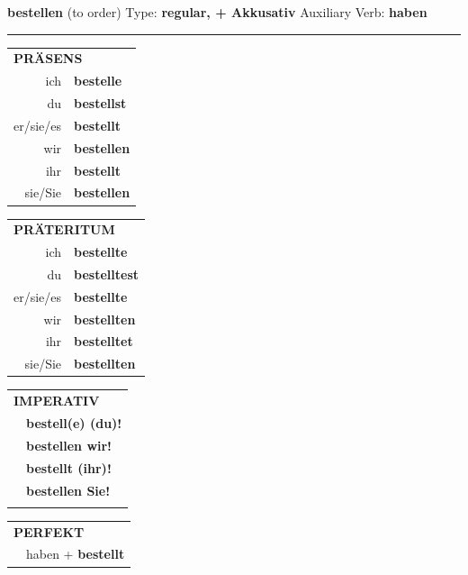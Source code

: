 \documentclass[10pt,a4paper]{revtex4-2}
\begin{document}
\begin{verbbox-acc}
    {\Large \bf bestellen} (to order) \hfill Type: \textbf{regular, + Akkusativ} \hfill Auxiliary Verb: \textbf{haben} 
    
     \vspace{5pt}

    \hrule
    
    \vspace{5pt}

  \begin{tabular}{rl}
     \multicolumn{2}{l}{\textbf{PRÄSENS} }\\
    ich & \textbf{bestelle}\\
    du & \textbf{bestellst}\\
    er/sie/es & \textbf{bestellt}\\
    wir & \textbf{bestellen}\\
    ihr & \textbf{bestellt}\\
    sie/Sie & \textbf{bestellen}\\
  \end{tabular}
  \hfill
     \begin{tabular}{rl}
    \multicolumn{2}{l}{\textbf{PRÄTERITUM} }\\
    ich & \textbf{bestellte}\\
    du & \textbf{bestelltest}\\
    er/sie/es & \textbf{bestellte}\\
    wir & \textbf{bestellten}\\
    ihr & \textbf{bestelltet}\\
    sie/Sie & \textbf{bestellten}\\
  \end{tabular}
  \hfill
  \begin{tabular}{rl}
     \multicolumn{2}{l}{\textbf{IMPERATIV} }\\
   & \textbf{bestell(e) (du)!}\\
   & \textbf{bestellen wir!}\\
   & \textbf{bestellt (ihr)!}\\
   & \textbf{bestellen Sie!}\\
   & \vspace{10pt}
  \end{tabular}

    \vspace{10pt}

 \begin{tabular}{rl}
     \multicolumn{2}{l}{\textbf{PERFEKT}}\\
   & haben + \textbf{bestellt}\\
  \end{tabular}
\hfill
   \begin{tabular}{rl}
   

\end{tabular}
\end{verbbox-acc}
\end{document}
